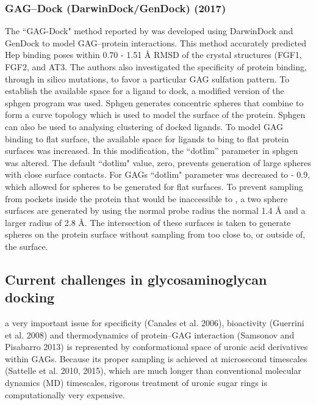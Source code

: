 \documentclass[journal=jctcce,manuscript=article]{achemso}
\begin{document}
{\subsubsection{GAG--Dock (DarwinDock/GenDock) (2017)}
The ``GAG-Dock" method reported by
\citeauthor{Griffith2017PredictingGrowth}\cite{Griffith2017PredictingGrowth} was developed using DarwinDock and GenDock to model GAG--protein interactions. This method accurately predicted \ac{Hep} binding poses within 0.70 - 1.51 \r{A} \ac{RMSD} of the crystal structures (\ac{FGF1}, \ac{FGF2}, and \ac{AT3}. The authors also investigated the specificity of protein binding, through in silico mutations, to favor a particular GAG sulfation pattern. 
To establish the available space for a ligand to dock, a modified version of the sphgen program\cite{Moustakas2006Development5} was used. Sphgen generates concentric spheres that combine to form a curve topology which is used to model the surface of the protein. 
Sphgen can also be used to analysing clustering of docked ligands.\cite{Hendrix1998SurfaceDocking.}
To model \ac{GAG} binding to flat surface, the available space for ligands to bing to flat protein surfaces was increased. In this modification, the “dotlim” parameter in sphgen was altered. The default ``dotlim" value, zero, prevents generation of large spheres with close surface contacts.\cite{Hendrix1998SurfaceDocking.} For \acp{GAG} ``dotlim" parameter was decreased to - 0.9, which allowed for spheres to be generated for flat surfaces.\cite{Griffith2017PredictingGrowth} To prevent sampling from pockets inside the protein that would be inaccessible to , a two sphere surfaces are generated by using the normal probe radius the normal 1.4 \r{A} and a larger radius of 2.8 \r{A}. The intersection of these surfaces is taken to generate spheres on the protein surface without sampling from too close to, or outside of, the surface.\cite{Griffith2017PredictingGrowth} 

\subsection{Current challenges in glycosaminoglycan docking}

a very important issue for specificity (Canales et al. 2006), bioactivity (Guerrini et al. 2008) and thermodynamics of protein–GAG interaction (Samsonov and Pisabarro 2013) is represented by conformational space of uronic acid derivatives within GAGs. Because its proper sampling is achieved at microsecond timescales (Sattelle et al. 2010, 2015), which are much longer than conventional molecular dynamics (MD) timescales, rigorous treatment of uronic sugar rings is computationally very expensive. \cite{Samsonov2016ComputationalComplexes}

}
\end{document}
